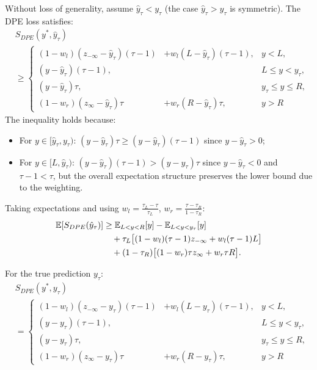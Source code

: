\documentclass[sigconf]{acmart}
\begin{document}
Without loss of generality, assume $\hat{y}_\tau < y_\tau$ (the case $\hat{y}_\tau > y_\tau$ is symmetric). The DPE loss satisfies:
\begin{align*}
&S_{DPE}(y^*, \hat{y}_\tau) \\
& \ge \left\{
\begin{aligned}
(1-w_l)(z_{-\infty}-\hat{y}_\tau)(\tau-1) &+ w_l(L-\hat{y}_\tau)(\tau-1), & y < L, \\
(y-\hat{y}_\tau)(\tau-1), & & L \le y < y_\tau, \\
(y-\hat{y}_\tau)\tau, & & y_\tau \le y \le R, \\
(1-w_r)(z_{\infty}-\hat{y}_\tau)\tau &+ w_r(R-\hat{y}_\tau)\tau, & y > R
\end{aligned}
\right.
\end{align*}
The inequality holds because:
\begin{itemize}
    \item For $y \in [\hat{y}_\tau, y_\tau)$: $(y-\hat{y}_\tau)\tau \ge (y-\hat{y}_\tau)(\tau-1)$ since $y-\hat{y}_\tau > 0$;
    \item For $y \in [L, \hat{y}_\tau)$: $(y-\hat{y}_\tau)(\tau-1) > (y-\hat{y}_\tau)\tau$ since $y-\hat{y}_\tau < 0$ and $\tau-1 < \tau$, but the overall expectation structure preserves the lower bound due to the weighting.
\end{itemize}

Taking expectations and using $w_l = \frac{\tau_L-\tau}{\tau_L}$, $w_r = \frac{\tau-\tau_R}{1-\tau_R}$:
\begin{align}
\mathbb{E}[S_{DPE}(\hat{y}_\tau)] &\ge \mathbb{E}_{L<y<R}[y] - \mathbb{E}_{L<y<y_\tau}[y] \notag\\
&\quad + \tau_L\bigl[(1-w_l)(\tau-1)z_{-\infty} + w_l(\tau-1)L\bigr] \notag\\
&\quad + (1-\tau_R)\bigl[(1-w_r)\tau z_{\infty} + w_r\tau R\bigr]. \label{eq:scen5_lb}
\end{align}

For the true prediction $y_\tau$:
\begin{align*}
&S_{DPE}(y^*, y_\tau) \\
& = \left\{
\begin{aligned}
(1-w_l)(z_{-\infty}-y_\tau)(\tau-1) &+ w_l(L-y_\tau)(\tau-1), & y < L, \\
(y-y_\tau)(\tau-1), & & L \le y < y_\tau, \\
(y-y_\tau)\tau, & & y_\tau \le y \le R, \\
(1-w_r)(z_{\infty}-y_\tau)\tau &+ w_r(R-y_\tau)\tau, & y > R
\end{aligned}
\right.
\end{align*}
\end{document}
